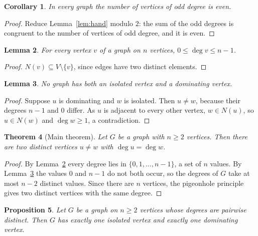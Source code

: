 \documentclass[11pt]{amsart}
\newtheorem{theorem}{Theorem}[section]
\newtheorem{lemma}[theorem]{Lemma}
\newtheorem{proposition}[theorem]{Proposition}
\newtheorem{corollary}[theorem]{Corollary}
\theoremstyle{definition}
\theoremstyle{remark}
\begin{document}
\begin{corollary}\label{cor:odd}
In every graph the number of vertices of odd degree is even.
\end{corollary}

\begin{proof}
Reduce Lemma~\ref{lem:hand} modulo $2$: the sum of the odd degrees is congruent
to the number of vertices of odd degree, and it is even.
\end{proof}

\begin{lemma}\label{lem:range}
For every vertex $v$ of a graph on $n$ vertices, $0\le \deg v\le n-1$.
\end{lemma}

\begin{proof}
$N(v)\subseteq V\setminus\{v\}$, since edges have two distinct elements.
\end{proof}

\begin{lemma}\label{lem:notboth}
No graph has both an isolated vertex and a dominating vertex.
\end{lemma}

\begin{proof}
Suppose $u$ is dominating and $w$ is isolated. Then $u\ne w$, because their
degrees $n-1$ and $0$ differ. As $u$ is adjacent to every other vertex, $w\in
N(u)$, so $u\in N(w)$ and $\deg w\ge 1$, a contradiction.
\end{proof}

\begin{theorem}[Main theorem]\label{thm:main}
Let $G$ be a graph with $n\ge 2$ vertices. Then there are two distinct vertices
$u\ne w$ with $\deg u=\deg w$.
\end{theorem}

\begin{proof}
By Lemma~\ref{lem:range} every degree lies in $\{0,1,\dots,n-1\}$, a set of $n$
values. By Lemma~\ref{lem:notboth} the values $0$ and $n-1$ do not both occur,
so the degrees of $G$ take at most $n-2$ distinct values. Since there are $n$
vertices, the pigeonhole principle gives two distinct vertices with the same
degree.
\end{proof}

\begin{proposition}\label{prop:distinct}
Let $G$ be a graph on $n\ge 2$ vertices whose degrees are pairwise distinct.
Then $G$ has exactly one isolated vertex and exactly one dominating vertex.
\end{proposition}
\end{document}
